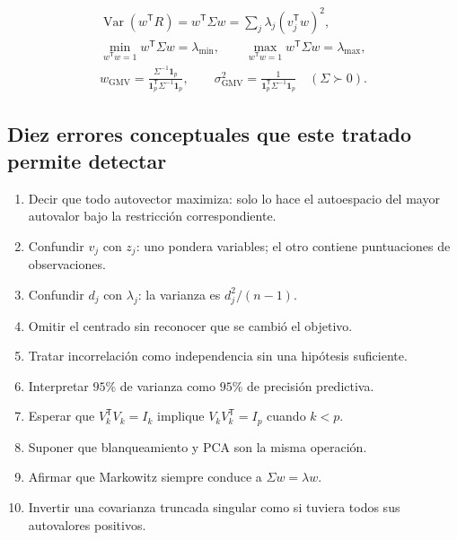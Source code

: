 \documentclass[11pt,a4paper]{article}
\newcommand{\T}{^{\mathsf T}}
\DeclareMathOperator{\Var}{Var}
\newcommand{\ones}{\mathbf 1}
\theoremstyle{definition}
\begin{document}
\begin{idea}
\begin{gather*}
\Var(w\T R)=w\T\Sigma w=\sum_j\lambda_j(v_j\T w)^2,\\
\min_{w\T w=1}w\T\Sigma w=\lambda_{\min},\qquad
\max_{w\T w=1}w\T\Sigma w=\lambda_{\max},\\
w_{\mathrm{GMV}}=\frac{\Sigma^{-1}\ones_p}{\ones_p\T\Sigma^{-1}\ones_p},\qquad
\sigma_{\mathrm{GMV}}^2=\frac1{\ones_p\T\Sigma^{-1}\ones_p}\quad(\Sigma\succ0).
\end{gather*}
\end{idea}
\subsection{Diez errores conceptuales que este tratado permite detectar}
\begin{enumerate}
\item Decir que todo autovector maximiza: solo lo hace el autoespacio del mayor autovalor bajo la restricción correspondiente.
\item Confundir $v_j$ con $z_j$: uno pondera variables; el otro contiene puntuaciones de observaciones.
\item Confundir $d_j$ con $\lambda_j$: la varianza es $d_j^2/(n-1)$.
\item Omitir el centrado sin reconocer que se cambió el objetivo.
\item Tratar incorrelación como independencia sin una hipótesis suficiente.
\item Interpretar $95\%$ de varianza como $95\%$ de precisión predictiva.
\item Esperar que $V_k\T V_k=I_k$ implique $V_kV_k\T=I_p$ cuando $k<p$.
\item Suponer que blanqueamiento y PCA son la misma operación.
\item Afirmar que Markowitz siempre conduce a $\Sigma w=\lambda w$.
\item Invertir una covarianza truncada singular como si tuviera todos sus autovalores positivos.
\end{enumerate}
\end{document}
